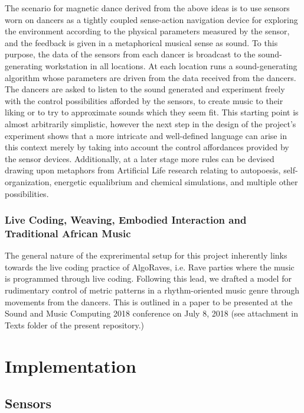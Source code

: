 \documentclass[11pt]{article}
\begin{document}
The scenario for magnetic dance derived from the above ideas is to use sensors worn on dancers as a tightly coupled sense-action navigation device for exploring the environment according to the physical parameters measured by the sensor, and the feedback is given in a metaphorical musical sense as sound.  To this purpose, the data of the sensors from each dancer is broadcast to the sound-generating workstation in all locations.  At each location runs a sound-generating algorithm whose parameters are driven from the data received from the dancers.  The dancers are asked to listen to the sound generated and experiment freely with the control possibilities afforded by the sensors, to create music to their liking or to try to approximate sounds which they seem fit.  This starting point is almost arbitrarily simplistic, however the next step in the design of the project's experiment shows that a more intricate and well-defined language can arise in this context merely by taking into account the control affordances provided by the sensor devices.  Additionally, at a later stage more rules can be devised drawing upon metaphors from Artificial Life research relating to autopoesis, self-organization, energetic equalibrium and chemical simulations, and multiple other possibilities.

\subsubsection{Live Coding, Weaving, Embodied Interaction and Traditional African Music}
\label{sec:org594f9f8}

The general nature of the exprerimental setup for this project inherently links towards the live coding practice of AlgoRaves, i.e. Rave parties where the music is programmed through live coding.  Following this lead, we drafted a model for rudimentary control of metric patterns in a rhythm-oriented music genre through movements from the dancers.  This is outlined in a paper to be presented at the Sound and Music Computing 2018 conference on July 8, 2018 (see attachment in Texts folder of the present repository.)  

\section{Implementation}
\label{sec:org56f50d3}

\subsection{Sensors}
\label{sec:org60ca8f7}
\end{document}
